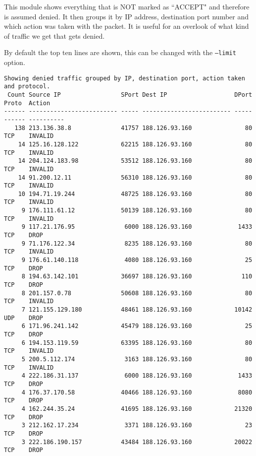\documentclass[english,twoside,openright,a4paper,12pt]{article}
\begin{document}
This module shows everything that is NOT marked as ``ACCEPT" and
therefore is assumed denied. It then groups it by IP address,
destination port number and which action was taken with the packet. It
is useful for an overlook of what kind of traffic we get that gets
denied.

By default the top ten lines are shown, this can be changed with the
\texttt{--limit} option.

\scriptsize \begin{verbatim}
Showing denied traffic grouped by IP, destination port, action taken and protocol.
 Count Source IP                 SPort Dest IP                   DPort Proto  Action
------ ------------------------- ----- ------------------------- ----- ------ ----------
   138 213.136.38.8              41757 188.126.93.160               80 TCP    INVALID   
    14 125.16.128.122            62215 188.126.93.160               80 TCP    INVALID   
    14 204.124.183.98            53512 188.126.93.160               80 TCP    INVALID   
    14 91.200.12.11              56310 188.126.93.160               80 TCP    INVALID   
    10 194.71.19.244             48725 188.126.93.160               80 TCP    INVALID   
     9 176.111.61.12             50139 188.126.93.160               80 TCP    INVALID   
     9 117.21.176.95              6000 188.126.93.160             1433 TCP    DROP      
     9 71.176.122.34              8235 188.126.93.160               80 TCP    INVALID   
     9 176.61.140.118             4080 188.126.93.160               25 TCP    DROP      
     8 194.63.142.101            36697 188.126.93.160              110 TCP    DROP      
     8 201.157.0.78              50608 188.126.93.160               80 TCP    INVALID   
     7 121.155.129.180           48461 188.126.93.160            10142 UDP    DROP      
     6 171.96.241.142            45479 188.126.93.160               25 TCP    DROP      
     6 194.153.119.59            63395 188.126.93.160               80 TCP    INVALID   
     5 200.5.112.174              3163 188.126.93.160               80 TCP    INVALID   
     4 222.186.31.137             6000 188.126.93.160             1433 TCP    DROP      
     4 176.37.170.58             40466 188.126.93.160             8080 TCP    DROP      
     4 162.244.35.24             41695 188.126.93.160            21320 TCP    DROP      
     3 212.162.17.234             3371 188.126.93.160               23 TCP    DROP      
     3 222.186.190.157           43484 188.126.93.160            20022 TCP    DROP  
\end{verbatim} \normalsize
\end{document}
